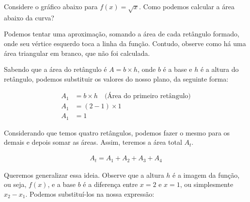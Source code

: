 \documentclass[12pt,openright,twoside,a4paper]{article}
\theoremstyle{definition}
\begin{document}
	Considere o gráfico abaixo para $f(x) = \sqrt{x}$. Como podemos calcular a área abaixo da curva?
	
	Podemos tentar uma aproximação, somando a área de cada retângulo formado, onde seu vértice esquerdo toca a linha da função. Contudo, observe como há uma área triangular em branco, que não foi calculada.
	
	\begin{center}
	\end{center}
	
	Sabendo que a área do retângulo é $A = b \times h$, onde $b$ é a base e $h$ é a altura do retângulo, podemos substituir os valores do nosso plano, da seguinte forma:
	
	\begin{align*}
		A_1 &= b \times h \quad \text{(Área do primeiro retângulo)}\\
		A_1 &= (2-1) \times 1\\
		A_1 &= 1
	\end{align*}
	
	Considerando que temos quatro retângulos, podemos fazer o mesmo para os demais e depois somar as áreas. Assim, teremos a área total $A_t$.
	
	\begin{align*}
		A_t = A_1 + A_2 + A_3 + A_4
	\end{align*}
	
	
	Queremos generalizar essa ideia. Observe que a altura $h$ é a imagem da função, ou seja, $f(x)$, e a base $b$ é a diferença entre $x=2$ e $x=1$, ou simplesmente $x_2 - x_1$. Podemos substituí-los na nossa expressão:
	
\end{document}
